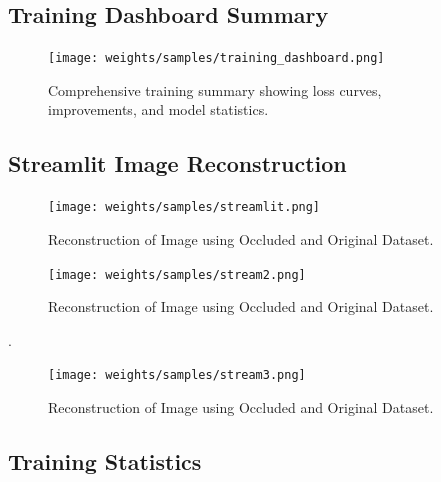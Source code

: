 \documentclass[12pt,a4paper]{article}
\begin{document}
\subsection{Training Dashboard Summary}

\begin{figure}[H]
\centering
\texttt{[image: weights/samples/training\_dashboard.png]}
\caption{Comprehensive training summary showing loss curves, improvements, and model statistics.}
\label{fig:dashboard}
\end{figure}

\subsection{Streamlit Image Reconstruction}

\begin{figure}[H]
\centering
\texttt{[image: weights/samples/streamlit.png]}
\caption{Reconstruction of Image using Occluded and Original Dataset.}
\label{fig:dashboard}
\end{figure}

\begin{figure}[H]
\centering
\texttt{[image: weights/samples/stream2.png]}
\caption{Reconstruction of Image using Occluded and Original Dataset.}
\label{fig:dashboard}
\end{figure}.

\begin{figure}[H]
\centering
\texttt{[image: weights/samples/stream3.png]}
\caption{Reconstruction of Image using Occluded and Original Dataset.}
\label{fig:dashboard}
\end{figure}


\subsection{Training Statistics}
\end{document}
